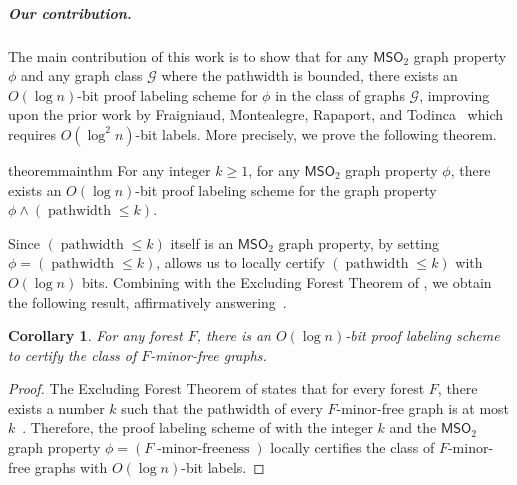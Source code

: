 \documentclass[11pt]{article}
\newtheorem{theorem}{Theorem}
\newtheorem{corollary}[lemma]{Corollary}
\theoremstyle{definition}
\theoremstyle{remark}
\newcommand{\MSO}{\mathsf{MSO}_2}
\begin{document}
\subparagraph{Our contribution.} The main contribution of this work is to show that for any $\MSO$ graph property $\phi$ and any graph class $\mathcal{G}$ where the pathwidth is bounded, there exists an $O(\log n)$-bit proof labeling scheme for $\phi$ in the class of graphs $\mathcal{G}$, improving upon the prior work by Fraigniaud, Montealegre, Rapaport, and Todinca~\cite{fraigniaud2024meta}  which requires $O(\log^2 n)$-bit labels. More precisely, we prove the following theorem.

\begin{restatable}{theorem}{mainthm}\label{thm:main}
For any integer $k \geq 1$, for any $\MSO$ graph property $\phi$, there exists an $O(\log n)$-bit proof labeling scheme for the graph property $\phi \wedge (\operatorname{pathwidth}\leq k)$. 
\end{restatable}



Since $(\operatorname{pathwidth}\leq k)$ itself is an $\MSO$ graph property, by setting $\phi = (\operatorname{pathwidth}\leq k)$,   allows us to locally certify $(\operatorname{pathwidth}\leq k)$ with $O(\log n)$ bits.
Combining  with the Excluding Forest Theorem of \citeauthor{ROBERTSON198339}, we obtain the following result, affirmatively answering~\cite[Question 54]{bousquet2024local}.


\begin{corollary}
For any forest $F$, there is an $O(\log n)$-bit proof labeling scheme to certify the class of $F$-minor-free graphs.
\end{corollary}
\begin{proof}
The Excluding Forest Theorem of \citeauthor{ROBERTSON198339} states that for every forest $F$, there exists a number $k$ such that the pathwidth of every $F$-minor-free graph is at most $k$~\cite{ROBERTSON198339}. Therefore, the proof labeling scheme of  with the integer $k$ and the $\MSO$ graph property $\phi = (F\operatorname{-minor-freeness})$ locally certifies the class of $F$-minor-free graphs with $O(\log n)$-bit labels.
\end{proof}
\end{document}
